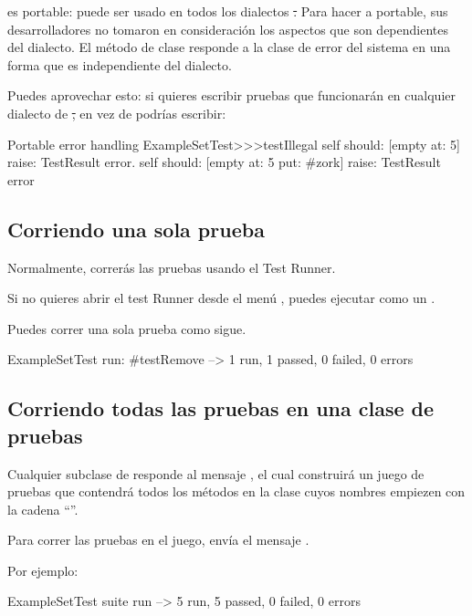 \documentclass[a4paper,10pt,twoside]{book}
\begin{document}
\sunit es portable: puede ser usado en todos los dialectos \st.  Para hacer a \sunit portable,
sus desarrolladores no tomaron en consideraci\'on los aspectos que son dependientes
del dialecto. El m\'etodo de clase  responde a la clase
de error del sistema en una forma que es independiente del dialecto.

Puedes aprovechar esto: si quieres escribir pruebas que funcionar\'an en cualquier dialecto de \st, en vez de
 podr\'ias escribir:

\begin{method}[portabletestillegal]{Portable error handling}
ExampleSetTest>>>testIllegal
	self should: [empty at: 5] raise: TestResult error.
	self should: [empty at: 5 put: #zork] raise: TestResult error
\end{method}


\subsection{Corriendo una sola prueba}
Normalmente, correr\'as las pruebas usando el Test Runner.

Si no quieres abrir el test Runner desde el men\'u ,
puedes ejecutar  como un .

Puedes correr una sola prueba como sigue.

\begin{code}{}
ExampleSetTest run: #testRemove --> 1 run, 1 passed, 0 failed, 0 errors
\end{code}

\subsection{Corriendo todas las pruebas en una clase de pruebas}

Cualquier subclase de  responde al mensaje , el cual
construir\'a un juego de pruebas que contendr\'a todos los
m\'etodos en la clase cuyos nombres empiezen con la cadena ``''.

Para correr las pruebas en el juego, env\'ia el mensaje .

Por ejemplo:

\begin{code}{}
ExampleSetTest suite run --> 5 run, 5 passed, 0 failed, 0 errors
\end{code}
\end{document}
